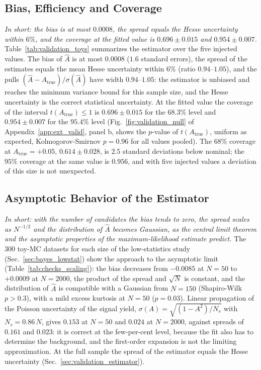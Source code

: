 \subsection{Bias, Efficiency and Coverage}
\emph{In short: the bias is at most $0.0008$, the spread equals the Hesse uncertainty within $6\%$, and the coverage at the fitted value is $0.696\pm0.015$ and $0.954\pm0.007$.}
Table~\ref{tab:validation_toys} summarizes the estimator over the five injected values. The bias of $\hat A$ is at most $0.0008$ ($1.6$ standard errors), the spread of the estimates equals the mean Hesse uncertainty within $6\%$ (ratio $0.94$--$1.05$), and the pulls $(\hat A-A_{\mathrm{true}})/\sigma(\hat A)$ have width $0.94$--$1.05$: the estimator is unbiased and reaches the minimum variance bound for this sample size, and the Hesse uncertainty is the correct statistical uncertainty. At the fitted value the coverage of the interval $t(A_{\mathrm{true}})\leq1$ is $0.696\pm0.015$ for the $68.3\%$ level and $0.954\pm0.007$ for the $95.4\%$ level (Fig.~\ref{fig:validation_null} of Appendix~\ref{app:ext_valid}, panel b, shows the $p$-value of $t(A_{\mathrm{true}})$, uniform as expected, Kolmogorov-Smirnov $p=0.96$ for all values pooled). The $68\%$ coverage at $A_{\mathrm{true}}=+0.05$, $0.614\pm0.028$, is $2.5$ standard deviations below nominal; the $95\%$ coverage at the same value is $0.956$, and with five injected values a deviation of this size is not unexpected.

\subsection{Asymptotic Behavior of the Estimator}
\label{sec:checks_scaling}
\emph{In short: with the number of candidates the bias tends to zero, the spread scales as $N^{-1/2}$ and the distribution of $\hat A$ becomes Gaussian, as the central limit theorem and the asymptotic properties of the maximum-likelihood estimate predict.}
The $300$ toy-MC datasets for each size of the low-statistics study (Sec.~\ref{sec:bayes_lowstat}) show the approach to the asymptotic limit (Table~\ref{tab:checks_scaling}): the bias decreases from $-0.0085$ at $N=50$ to $+0.0009$ at $N=2000$, the product of the spread and $\sqrt N$ is constant, and the distribution of $\hat A$ is compatible with a Gaussian from $N=150$ (Shapiro-Wilk $p>0.3$), with a mild excess kurtosis at $N=50$ ($p=0.03$). Linear propagation of the Poisson uncertainty of the signal yield, $\sigma(A)=\sqrt{(1-A^2)/N_s}$ with $N_s=0.86\,N$, gives $0.153$ at $N=50$ and $0.024$ at $N=2000$, against spreads of $0.161$ and $0.023$: it is correct at the few-per-cent level, because the fit also has to determine the background, and the first-order expansion is not the limiting approximation. At the full sample the spread of the estimator equals the Hesse uncertainty (Sec.~\ref{sec:validation_estimator}).


